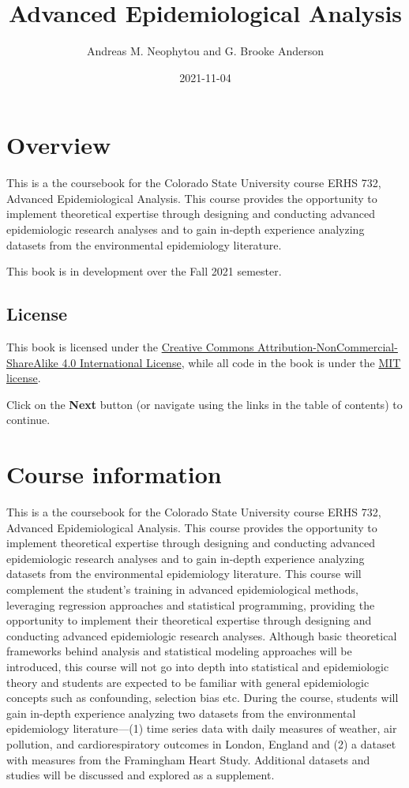 \documentclass[
]{book}
\title{Advanced Epidemiological Analysis}
\author{Andreas M. Neophytou and G. Brooke Anderson}
\date{2021-11-04}
\begin{document}
\maketitle

{
\setcounter{tocdepth}{1}
\tableofcontents
}
\hypertarget{overview}{%
\chapter{Overview}\label{overview}}

This is a the coursebook for the Colorado State University course ERHS 732,
Advanced Epidemiological Analysis. This course provides the opportunity to
implement theoretical expertise through designing and conducting advanced
epidemiologic research analyses and to gain in-depth experience analyzing
datasets from the environmental epidemiology literature.

This book is in development over the Fall 2021 semester.

\hypertarget{license}{%
\section{License}\label{license}}

This book is licensed under the \href{https://creativecommons.org/licenses/by-nc-sa/4.0/}{Creative Commons
Attribution-NonCommercial-ShareAlike 4.0 International
License}, while all code in
the book is under the \href{https://opensource.org/licenses/MIT}{MIT license}.

Click on the \textbf{Next} button (or navigate using the links in the table of
contents) to continue.

\hypertarget{courseinfo}{%
\chapter{Course information}\label{courseinfo}}

This is a the coursebook for the Colorado State University course ERHS 732,
Advanced Epidemiological Analysis. This course provides the opportunity to
implement theoretical expertise through designing and conducting advanced
epidemiologic research analyses and to gain in-depth experience analyzing
datasets from the environmental epidemiology literature. This course will
complement the student's training in advanced epidemiological methods,
leveraging regression approaches and statistical programming, providing the
opportunity to implement their theoretical expertise through designing and
conducting advanced epidemiologic research analyses. Although basic theoretical frameworks behind analysis and statistical modeling approaches will be introduced, this course will not go into depth into statistical and epidemiologic theory and students are expected to be familiar with general epidemiologic concepts such as confounding, selection bias etc. During the course,
students will gain in-depth experience analyzing two datasets from the
environmental epidemiology literature---(1) time series data with daily measures
of weather, air pollution, and cardiorespiratory outcomes in London, England and
(2) a dataset with measures from the Framingham Heart Study. Additional datasets
and studies will be discussed and explored as a supplement.
\end{document}
